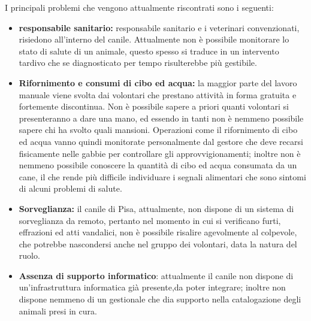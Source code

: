 I principali problemi che vengono attualmente riscontrati sono i seguenti:
\begin{itemize}
    \item \textbf{responsabile sanitario:} responsabile sanitario e i veterinari convenzionati, risiedono all'interno del canile.
    Attualmente non è possibile monitorare lo stato di salute di un animale, questo spesso si traduce in un intervento tardivo che se diagnosticato per tempo risulterebbe più gestibile.
    \item \textbf{Rifornimento e consumi di cibo ed acqua:} la maggior parte del lavoro manuale viene svolta dai volontari che prestano attività in forma gratuita e fortemente discontinua. Non è possibile sapere a priori quanti volontari si presenteranno a dare una mano, ed essendo in tanti non è nemmeno possibile sapere chi ha svolto quali mansioni. Operazioni come il rifornimento di cibo ed acqua vanno quindi monitorate personalmente dal gestore che deve recarsi fisicamente nelle gabbie per controllare gli approvvigionamenti; inoltre non è nemmeno possibile conoscere la quantità di cibo ed acqua consumata da un cane, il che rende più difficile individuare i segnali alimentari che sono sintomi di alcuni problemi di salute.
    \item \textbf{Sorveglianza:} il canile di Pisa, attualmente, non dispone di un sistema di sorveglianza da remoto, pertanto nel momento in cui si verificano furti, effrazioni ed atti vandalici, non è possibile risalire agevolmente al colpevole, che potrebbe nascondersi anche nel gruppo dei volontari, data la natura del ruolo.
    
    \item \textbf{Assenza di supporto informatico}: attualmente il canile non dispone di un'infrastruttura informatica già presente,da poter integrare; inoltre non dispone nemmeno di un gestionale che dia supporto nella catalogazione degli animali presi in cura.
\end{itemize}
 




